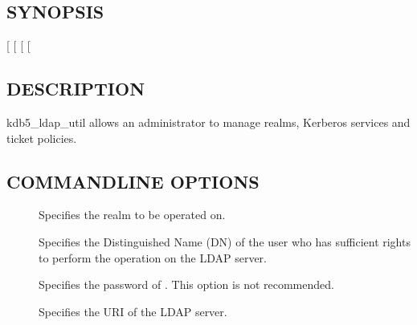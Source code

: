 \documentclass[letterpaper,10pt,english]{sphinxmanual}
\begin{document}
\subsection{SYNOPSIS}
\label{\detokenize{admin/admin_commands/kdb5_ldap_util:synopsis}}\label{\detokenize{admin/admin_commands/kdb5_ldap_util:kdb5-ldap-util-synopsis}}
\sphinxAtStartPar
{}
{[}  {[} \sphinxstyleemphasis{passwd}{]}{]}
{[} \sphinxstyleemphasis{ldapuri}{]}
{[}\sphinxstyleemphasis{command\_options}{]}


\subsection{DESCRIPTION}
\label{\detokenize{admin/admin_commands/kdb5_ldap_util:description}}\label{\detokenize{admin/admin_commands/kdb5_ldap_util:kdb5-ldap-util-synopsis-end}}
\sphinxAtStartPar
kdb5\_ldap\_util allows an administrator to manage realms, Kerberos
services and ticket policies.


\subsection{COMMAND\sphinxhyphen{}LINE OPTIONS}
\label{\detokenize{admin/admin_commands/kdb5_ldap_util:command-line-options}}\label{\detokenize{admin/admin_commands/kdb5_ldap_util:kdb5-ldap-util-options}}\begin{description}
\item[{ }] \leavevmode
\sphinxAtStartPar
Specifies the realm to be operated on.

\item[{ }] \leavevmode
\sphinxAtStartPar
Specifies the Distinguished Name (DN) of the user who has
sufficient rights to perform the operation on the LDAP server.

\item[{ }] \leavevmode
\sphinxAtStartPar
Specifies the password of .  This option is not
recommended.

\item[{ }] \leavevmode
\sphinxAtStartPar
Specifies the URI of the LDAP server.

\end{description}
\end{document}
